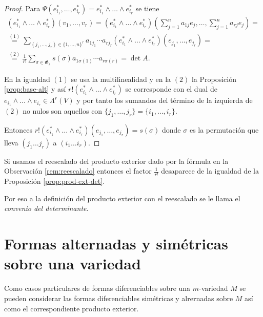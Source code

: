 \documentclass[../VD.tex]{subfiles}
\begin{document}
\begin{proof}
  Para \(\Psi(e_{i_{1}}^{*},\dots,e_{i_{r}}^{*})=e_{i_{1}}^{*}\wedge\dots\wedge
  e_{i_{r}}^{*}\) se tiene
  \[
    \begin{array}{l}
       (e_{i_{1}}^{*}\wedge\dots\wedge e_{i_{r}}^{*})(v_{1},\dots,v_{r})=(e_{i_{1}}^{*}
    \wedge\dots\wedge e_{i_{r}}^{*})(\sum_{j=1}^{n}a_{1j}e_{j},
    \dots,\sum_{j=1}^{n}a_{rj}e_{j})= \\
      \overset{(1)}{=}
      \sum_{(j_{1},\dots,j_{r})\in\{1,\dots,n\}^{r}}a_{1j_{1}}\cdots a_{rj_{r}}
    (e_{i_{1}}^{*}\wedge\dots\wedge e_{i_{r}}^{*})(e_{j_{1}},
    \dots,e_{j_{r}})= \\
    \overset{(2)}{=}\frac{1}{r!}\sum_{\sigma\in \mathfrak{G}_{r}}s(\sigma) a_{1\sigma(1)}
    \cdots a_{r\sigma(r)}=\det{A}.
    \end{array}
  \]

  En la igualdad \((1)\) se usa la multilinealidad y en la \((2)\) la
  Proposición \ref{prop:base-alt} y así \(r!(e_{i_{1}}^{*}\wedge\dots\wedge
  e_{i_{r}}^{*})\) se corresponde con el dual de \(e_{i_{1}}\wedge\dots\wedge
  e_{i_{r}}\in\Lambda^{r}(V)\) y por tanto los sumandos del término de la
  izquierda de \((2)\) no nulos son aquellos con
  \(\{j_{1},\dots,j_{r}\}=\{i_{1},\dots,i_{r}\}\).

  Entonces \(r!(e_{i_{1}}^{*}\wedge\dots\wedge
  e_{i_{r}}^{*})(e_{j_{1}},\dots,e_{j_{r}})= s(\sigma)\) donde \(\sigma\) es
  la permutación que lleva \((j_{1}\dots j_{r})\) a \((i_{1}\dots i_{r})\).
\end{proof}

\begin{remark}
  Si usamos el reescalado del producto exterior dado por la fórmula en la
  Observación \ref{rem:reescalado} entonces el factor \(\frac{1}{r!}\) desaparece de la
  igualdad de la Proposición \ref{prop:prod-ext-det}.

  Por eso a la definición del producto exterior con el reescalado se le llama el
  \emph{convenio del determinante}.
\end{remark}

\section{Formas alternadas y simétricas sobre una variedad}

Como casos particulares de formas diferenciables sobre una \(m\)-variedad \(M\)
se pueden considerar las formas diferenciables simétricas y alrernadas sobre
\(M\) así como el correspondiente producto exterior.
\end{document}
